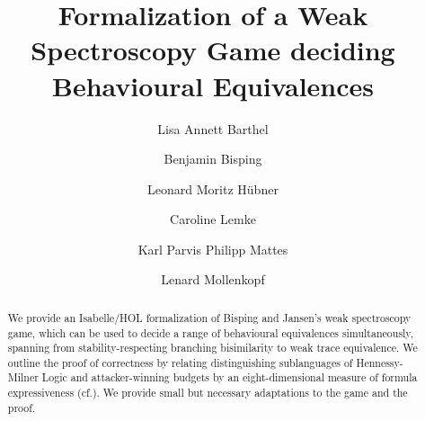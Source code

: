 \documentclass[11pt,a4paper]{article}
\begin{document}
\title{Formalization of a Weak Spectroscopy Game deciding Behavioural Equivalences}
\author{Lisa Annett Barthel \and Benjamin Bisping \and Leonard Moritz Hübner \and Caroline Lemke \and Karl Parvis Philipp Mattes \and Lenard Mollenkopf}
\maketitle

\begin{abstract}
\noindent We provide an Isabelle/HOL formalization of Bisping and Jansen's \cite{bisping2023lineartimebranchingtime} weak spectroscopy game, which can be used to decide
a range of behavioural equivalences simultaneously, spanning from stability-respecting branching bisimilarity to weak trace equivalence.
We outline the proof of correctness by relating distinguishing sublanguages of Hennessy-Milner Logic and attacker-winning budgets by an eight-dimensional 
measure of formula expressiveness (cf.\cite[Abstract]{bisping2023lineartimebranchingtime}). We provide small but necessary adaptations to the game and the proof.
\end{abstract}

\tableofcontents



















\newpage
\appendix



\end{document}
